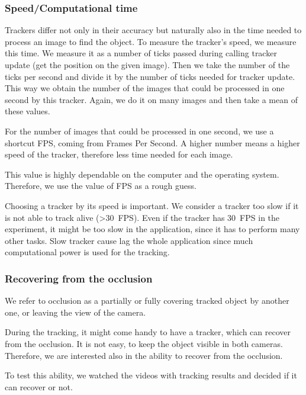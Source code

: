\subsubsection*{Speed/Computational time}

Trackers differ not only in their accuracy but naturally also in the time
needed to process an image to find the object. To measure the tracker's speed,
we measure this time. We measure it as a number of ticks passed during calling
tracker update (get the position on the given image). Then we take the number
of the ticks per second and divide it by the number of ticks needed for tracker
update. This way we obtain the number of the images that could be processed in
one second by this tracker. Again, we do it on many images and then take a mean
of these values.

For the number of images that could be processed in one second, we use a
shortcut FPS, coming from Frames Per Second. A higher number means a higher
speed of the tracker, therefore less time needed for each image.

This value is highly dependable on the computer and the operating system.
Therefore, we use the value of FPS as a rough guess.


Choosing a tracker by its speed is important. We consider a tracker too slow if
it is not able to track alive (>30~FPS). Even if the tracker has 30~FPS in the
experiment, it might be too slow in the application, since it has to perform
many other tasks. Slow tracker cause lag the whole application since much
computational power is used for the tracking.

\subsubsection*{Recovering from the occlusion}

We refer to occlusion as a partially or fully covering tracked object by
another one, or leaving the view of the camera.

During the tracking, it might come handy to have a tracker, which can recover
from the occlusion. It is not easy, to keep the object visible in both cameras.
Therefore, we are interested also in the ability to recover from the occlusion.

To test this ability, we watched the videos with tracking results and decided
if it can recover or not.

